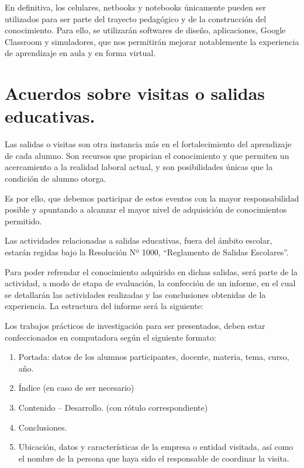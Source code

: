 \documentclass[../main]{subfiles}
\begin{document}
 

En definitiva, los celulares, netbooks y notebooks únicamente pueden ser utilizados para ser parte del trayecto pedagógico y de la construcción del conocimiento. Para ello, se utilizarán softwares de diseño, aplicaciones, Google Classroom y simuladores, que nos permitirán mejorar notablemente la experiencia de aprendizaje en aula y en forma virtual. 

 

\section{Acuerdos sobre visitas o salidas educativas.} 

Las salidas o visitas son otra instancia más en el fortalecimiento del aprendizaje de cada alumno. Son recursos que propician el conocimiento y que permiten un acercamiento a la realidad laboral actual, y son posibilidades únicas que la condición de alumno otorga.  

Es por ello, que debemos participar de estos eventos con la mayor responsabilidad posible y apuntando a alcanzar el mayor nivel de adquisición de conocimientos permitido. 

Las actividades relacionadas a salidas educativas, fuera del ámbito escolar, estarán regidas bajo la Resolución Nº 1000, “Reglamento de Salidas Escolares”. 

Para poder refrendar el conocimiento adquirido en dichas salidas, será parte de la actividad, a modo de etapa de evaluación, la confección de un informe, en el cual se detallarán las actividades realizadas y las conclusiones obtenidas de la experiencia. La estructura del informe será la siguiente: 

Los trabajos prácticos de investigación para ser presentados, deben estar confeccionados en computadora según el siguiente formato: 

\begin{enumerate}[label=\alph*)]






\item Portada: datos de los alumnos participantes, docente, materia, tema, curso, año. 

\item Índice (en caso de ser necesario) 

\item Contenido – Desarrollo. (con rótulo correspondiente) 

\item Conclusiones. 

\item Ubicación, datos y características de la empresa o entidad visitada, así como el nombre de la persona que haya sido el responsable de coordinar la visita. 
 
\end{enumerate}
 
\end{document}

